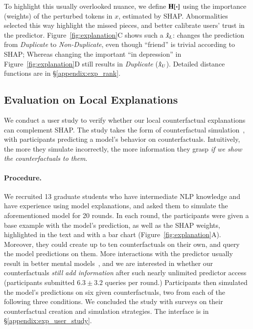 To highlight this usually overlooked nuance, we define $\operatorname*{\mathbf{H}}[\boldsymbol{\cdot}]$ using the importance (weights) of the perturbed tokens in $x$, estimated by SHAP.
Abnormalities selected this way highlight the missed pieces, and better calibrate users' trust in the predictor. 
Figure~\ref{fig:explanation}C shows such a $\hat{x}_L$:  changes the prediction from \emph{Duplicate} to \emph{Non-Duplicate}, even though ``friend'' is trivial according to SHAP; Whereas changing the important ``in depression'' in Figure~\ref{fig:explanation}D still results in \emph{Duplicate} ($\hat{x}_U$).
Detailed distance functions are in \S\ref{appendix:exp_rank}.



\subsection{Evaluation on Local Explanations}
\label{subsec:exp_user_study}

We conduct a user study to verify whether our local counterfactual explanations can complement SHAP.
The study takes the form of counterfactual simulation~\cite{hase2020evaluating}, with participants predicting a model's behavior on counterfactuals.
Intuitively, the more they simulate incorrectly, the more information they grasp \emph{if we show the counterfactuals to them}.

\paragraph{Procedure.}
We recruited 13 graduate students who have intermediate NLP knowledge and have experience using model explanations, and asked them to simulate the aforementioned \qqp model for 20 rounds.
In each round, the participants were given a base example with the model's prediction, as well as the SHAP weights, highlighted in the text and with a bar chart (Figure~\ref{fig:explanation}A).
Moreover, they could create up to ten counterfactuals on their own, and query the model predictions on them.
More interactions with the predictor usually result in better mental models~\cite{miller}, and we are interested in whether our counterfactuals \emph{still add information} after such nearly unlimited predictor access (participants submitted $6.3\pm3.2$ queries per round.)
Participants then simulated the model's predictions on six given counterfactuals, two from each of the following three conditions.
We concluded the study with surveys on their counterfactual creation and simulation strategies.
The interface is in \S\ref{appendix:exp_user_study}.


